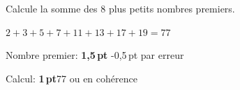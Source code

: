 
\question[2\half]
Calcule la somme des 8 plus petits nombres premiers.

\vspace{10pt}{\footnotesize\raggedleft Espace pour ta démarche et tes calculs\par}
	\begin{solutionorgrid}[100pt]
	
		\vspace{10pt}
		$2 + 3 + 5 + 7 + 11 + 13 + 17 + 19 = 77$
		
		\vspace{10pt}Nombre premier: \textbf{1,5\,pt} -0,5\,pt par erreur
		
		Calcul: \textbf{1\,pt}77 ou en cohérence
	\end{solutionorgrid}

